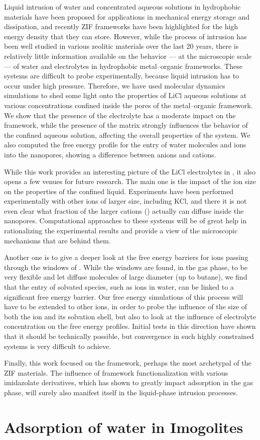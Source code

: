 \documentclass[thesis]{subfiles}
\begin{document}
Liquid intrusion of water and concentrated aqueous solutions in hydrophobic
materials have been proposed for applications in mechanical energy storage and
dissipation, and recently ZIF frameworks have been highlighted for the high
energy density that they can store. However, while the process of intrusion has
been well studied in various zeolitic materials over the last 20 years, there is
relatively little information available on the behavior --- at the microscopic
scale --- of water and electrolytes in hydrophobic metal--organic frameworks.
These systems are difficult to probe experimentally, because liquid intrusion
has to occur under high pressure. Therefore, we have used molecular dynamics
simulations to shed some light onto the properties of LiCl aqueous solutions at
various concentrations confined inside the pores of the  metal--organic
framework. We show that the presence of the electrolyte has a moderate impact on
the  framework, while the presence of the  matrix strongly influences
the behavior of the confined aqueous solution, affecting the overall properties
of the system. We also computed the free energy profile for the entry of water
molecules and ions into the nanopores, showing a difference between anions and
cations.

While this work provides an interesting picture of the LiCl electrolytes in
, it also opens a few venues for future research. The main one is the
impact of the ion size on the properties of the confined liquid. Experiments
have been performed experimentally with other ions of larger size, including
KCl, and there it is not even clear what fraction of the larger cations
() actually can diffuse inside the nanopores. Computational approaches to
these systems will be of great help in rationalizing the experimental results
and provide a view of the microscopic mechanisms that are behind them.

Another one is to give a deeper look at the free energy barriers for ions
passing through the windows of . While the windows are found, in the gas
phase, to be very flexible and let diffuse molecules of large diameter (up to
butane), we find that the entry of solvated species, such as ions in water, can
be linked to a significant free energy barrier. Our free energy simulations of
this process will have to be extended to other ions, in order to probe the
influence of the size of both the ion and its solvation shell, but also to look
at the influence of electrolyte concentration on the free energy profiles.
Initial tests in this direction have shown that it should be technically
possible, but convergence in such highly constrained systems is very difficult
to achieve.

Finally, this work focused on the  framework, perhaps the most archetypal
of the ZIF materials. The influence of framework functionalization with various
imidazolate derivatives, which has shown to greatly impact adsorption in the gas
phase, will surely also manifest itself in the liquid-phase intrusion processes.

\section{Adsorption of water in Imogolites}
\end{document}
